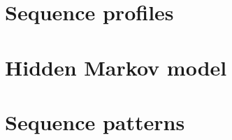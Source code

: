 \documentclass[12pt]{article}
\begin{document}
\section{Sequence profiles}






\newpage

%
%
\setcounter{figure}{0}
\setcounter{table}{0}
\section{Hidden Markov model}




\newpage

%
%
\setcounter{figure}{0}
\setcounter{table}{0}
\section{Sequence patterns}



\end{document}
